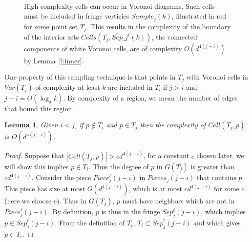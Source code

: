 \documentclass[12pt,a4paper,USenglish,cleveref, autoref, thm-restate]{article}
\newcommand{\Cell}{\mathit{Cell}}
\newcommand{\Cells}{\mathit{Cells}}
\newcommand{\Sample}{\mathit{Sample}}
\newcommand{\Piece}{\mathit{Piece}}
\newcommand{\Pieces}{\mathit{Pieces}}
\newcommand{\Sep}{\mathit{Sep}}
\newcommand{\Voron}{\mathit{Vor}}
\newcommand{\john}[1]{\textcolor{red}{#1}}
\newcommand{\yakov}[1]{\textcolor{blue}{Yakov: #1}}
\newtheorem{lemma}{Lemma}
\newcommand{\Cell}{\mathit{Cell}}
\newcommand{\Cells}{\mathit{Cells}}
\newcommand{\Sample}{\mathit{Sample}}
\newcommand{\Piece}{\mathit{Piece}}
\newcommand{\Pieces}{\mathit{Pieces}}
\newcommand{\Sep}{\mathit{Sep}}
\newcommand{\Voron}{\mathit{Vor}}
\newcommand{\john}[1]{\textcolor{red}{#1}}
\newcommand{\yakov}[1]{\textcolor{blue}{Yakov: #1}}
\newcommand{\Cell}{\mathit{Cell}}
\newcommand{\Cells}{\mathit{Cells}}
\newcommand{\Sample}{\mathit{Sample}}
\newcommand{\Piece}{\mathit{Piece}}
\newcommand{\Pieces}{\mathit{Pieces}}
\newcommand{\Sep}{\mathit{Sep}}
\newcommand{\Voron}{\mathit{Vor}}
\newcommand{\john}[1]{\textcolor{red}{#1}}
\newcommand{\yakov}[1]{\textcolor{blue}{Yakov: #1}}
\begin{document}
\begin{figure}[t]
    \centering
    \caption{
    High complexity cells can occur in Voronoi diagrams. Such cells must be included in fringe verticies $\Sample_j(k)$, illustrated in red for some point set $T_j$. This results in the complexity of the boundary of the interior sets $\Cells(T_j,\overline{\Sep}\_j^\ell(k))$, the connected components of white Voronoi cells, are of complexity $O(d^{4(j-i)})$ by Lemma~\ref{l:inner}.}
    \label{fig:inner}
\end{figure}


One property of this sampling technique is that points in $T_j$ with Voronoi cells in $\Voron(T_j)$ of complexity at least $k$ are included in $T_i$ if $j>i$ and $j-i=O(\log_d k)$. By complexity of a region, we mean the number of edges that bound this region.



\begin{lemma}
Given $i<j$, if $p \not \in T_i$ and $p \in T_j$ then the complexity of $\Cell(T_j,p)$ is $O(d^{4(j-i)})$. 
\end{lemma}

\begin{proof}
 Suppose that $|\Cell(T_j,p)| > c d^{4(j-i)}$, for a constant $c$ chosen later, we will show this implies $p\in T_i$. Thus the degree of $p$ in $G(T_j)$ is greater than $c d^{4(j-i)}$. Consider the piece $\Piece^\ell_j(j-i)$ in $\Pieces_j(j-i)$ that contains $p$. This piece has size at most $O(d^{4(j-i)})$, which is at most $c d^{4(j-i)}$ for some $c$ (here we choose $c$).
 Thus in $G(T_j)$, $p$ must have neighbors which are not in $\Piece^\ell_j(j-i)$. By definition, $p$ is thus in the fringe $Sep^\ell_j(j-i)$, which implies $p \in \Sep^\ell_j(j-i)$. From the definition of $T_i$, $T_i \subset \Sep^\ell_j(j-i)$ and which gives $p \in T_i$. 
 \end{proof}
\end{document}
